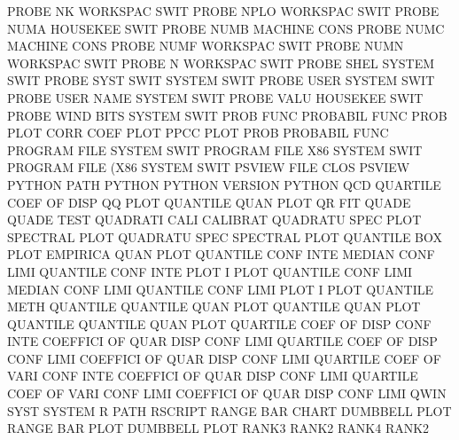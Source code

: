 PROBE    NK                             WORKSPAC SWIT
PROBE    NPLO                           WORKSPAC SWIT
PROBE    NUMA                           HOUSEKEE SWIT
PROBE    NUMB                           MACHINE  CONS
PROBE    NUMC                           MACHINE  CONS
PROBE    NUMF                           WORKSPAC SWIT
PROBE    NUMN                           WORKSPAC SWIT
PROBE    N                              WORKSPAC SWIT
PROBE    SHEL                           SYSTEM   SWIT
PROBE    SYST SWIT                      SYSTEM   SWIT
PROBE    USER                           SYSTEM   SWIT
PROBE    USER NAME                      SYSTEM   SWIT
PROBE    VALU                           HOUSEKEE SWIT
PROBE    WIND BITS                      SYSTEM   SWIT
PROB     FUNC                           PROBABIL FUNC
PROB     PLOT CORR COEF PLOT            PPCC     PLOT
PROB                                    PROBABIL FUNC
PROGRAM  FILE                           SYSTEM   SWIT
PROGRAM  FILE X86                       SYSTEM   SWIT
PROGRAM  FILE (X86                      SYSTEM   SWIT
PSVIEW   FILE CLOS                      PSVIEW
PYTHON   PATH                           PYTHON
PYTHON   VERSION                        PYTHON
QCD                                     QUARTILE COEF OF   DISP
QQ       PLOT                           QUANTILE QUAN PLOT
QR                                      FIT
QUADE                                   QUADE    TEST
QUADRATI CALI                           CALIBRAT
QUADRATU SPEC PLOT                      SPECTRAL PLOT
QUADRATU SPEC                           SPECTRAL PLOT
QUANTILE BOX  PLOT                      EMPIRICA QUAN PLOT
QUANTILE CONF INTE                      MEDIAN   CONF LIMI
QUANTILE CONF INTE PLOT                 I        PLOT
QUANTILE CONF LIMI                      MEDIAN   CONF LIMI
QUANTILE CONF LIMI PLOT                 I        PLOT
QUANTILE METH                           QUANTILE
QUANTILE QUAN PLOT                      QUANTILE QUAN PLOT
QUANTILE                                QUANTILE QUAN PLOT
QUARTILE COEF OF   DISP CONF INTE       COEFFICI OF   QUAR DISP CONF LIMI
QUARTILE COEF OF   DISP CONF LIMI       COEFFICI OF   QUAR DISP CONF LIMI
QUARTILE COEF OF   VARI CONF INTE       COEFFICI OF   QUAR DISP CONF LIMI
QUARTILE COEF OF   VARI CONF LIMI       COEFFICI OF   QUAR DISP CONF LIMI
QWIN     SYST                           SYSTEM
R        PATH                           RSCRIPT
RANGE    BAR  CHART                     DUMBBELL PLOT
RANGE    BAR  PLOT                      DUMBBELL PLOT
RANK3                                   RANK2
RANK4                                   RANK2
